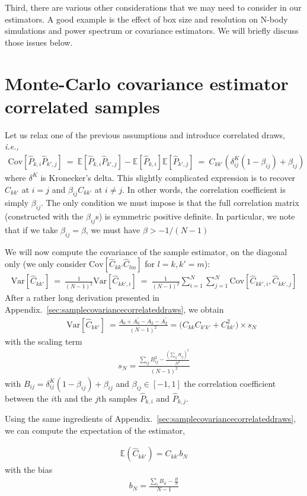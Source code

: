 \documentclass{aastex6}
\newcommand{\ie}{{\textit{i.e.,}~}}
\newcommand{\appref}[1]{{\xspace}Appendix.~\ref{#1}}
\newcommand{\eqn}[1]{\begin{eqnarray}#1\end{eqnarray}}
\begin{document}
Third, there are various other considerations that we may need to consider in our estimators. A good example is the effect of box size and resolution on N-body simulations and power spectrum or covariance estimators. 
We will briefly discuss those issues below.

\section{Monte-Carlo covariance estimator correlated samples}


Let us relax one of the previous assumptions and introduce correlated draws, \ie
\eqn{
	\mathrm{Cov}[\hat{P}_{k, i}\hat{P}_{k', j}] \ = \ \mathbb{E}[\hat{P}_{k, i}\hat{P}_{k', j}] - \mathbb{E}[\hat{P}_{k, i}]\mathbb{E}[\hat{P}_{k', j}]  \ =  \ C_{kk'} \left( \delta^K_{ij}(1-\beta_{ij}) + \beta_{ij} \right)
}
where $\delta^K$ is Kronecker's delta. This slightly complicated expression is to recover $C_{kk'}$ at $i=j$ and $\beta_{ij}C_{kk'}$ at $i\neq j$. In other words, the correlation coefficient is simply $\beta_{ij}$. The only condition we must impose is that the full correlation matrix (constructed with the $\beta_{ij}$s) is symmetric positive definite. In particular, we note that if we take $\beta_{ij}=\beta$, we must have $\beta > -1/(N-1)$

We will now compute the covariance of the sample estimator, on the diagonal only (we only consider $\mathrm{Cov}[\hat{C}_{kk'}\hat{C}_{lm}]$ for $l=k, k'=m$):
\eqn{
	\mathrm{Var}[\hat{C}_{kk'}] \ =\   \frac{1}{(N-1)^2} \mathrm{Var}\left[ \hat{C}_{kk',i}  \right]  
	\ = \   \frac{1}{(N-1)^2}\sum_{i=1}^{N}\sum_{j=1}^{N} \mathrm{Cov}[\hat{C}_{kk',i} , \hat{C}_{kk',j} ]
}
After a rather long derivation presented in \appref{sec:samplecovariancecorrelateddraws}, we obtain
\eqn{
	&&  \ \mathrm{Var}[\hat{C}_{kk'}] \ = \frac{
	 A_0   +	  A_0^\prime  - A_2 - A_2^\prime}{(N-1)^2}  =    \bigl(C_{kk}C_{k'k'} + C_{kk'}^2 \bigr) \times s_N
}
with the scaling term 
\eqn{
	s_N = \frac{ \sum_{ij} B_{ij}^2  - \frac{(\sum_{ij} B_{ij})^2}{N^2}}{(N-1)^2}
}
	 with $B_{ij} =  \delta^K_{ij}(1-\beta_{ij}) + \beta_{ij} $ and $\beta_{ij} \in [-1, 1]$ the correlation coefficient between the $i$th and the $j$th samples $\hat{P}_{k, i}$ and $\hat{P}_{k, j}$. 

Using the same ingredients of \appref{sec:samplecovariancecorrelateddraws}, we can compute the expectation of the estimator,

\eqn{
	\mathbb{E}(\hat{C}_{kk'}) = C_{kk'} b_N
}
with the bias
\eqn{
	b_N = \frac{\sum_i B_{ii} - \frac{B}{N}}{N-1}
}
\end{document}

